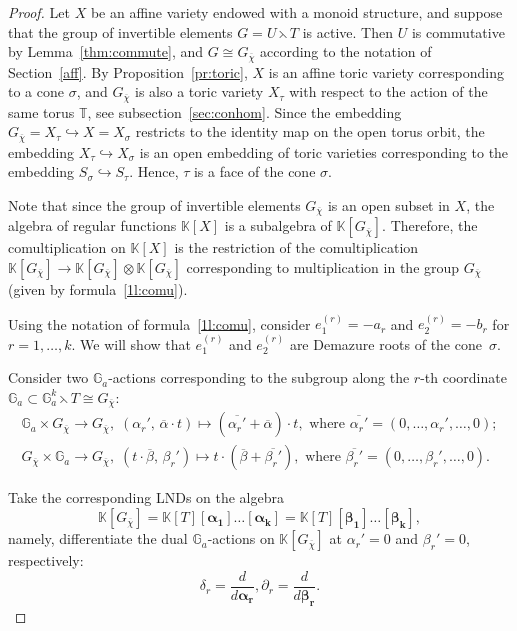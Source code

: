 \documentclass[a4paper, 11pt]{amsart}
\theoremstyle{plain}
\theoremstyle{remark}
\theoremstyle{definition}
\newcommand{\KK}{\mathbb{K}}
\newcommand{\G}{\mathbb{G}}
\newcommand{\GG}{G_{\overline{\chi}}}
\newcommand{\TT}{\mathbb{T}}
\newcommand{\ol}[1]{\overline{#1}}
\newcommand{\Alp}[1]{\pmb{\alpha_{#1}}}
\newcommand{\Bet}[1]{\pmb{\beta_{#1}}}
\begin{document}
\begin{proof}
	Let $X$ be an affine variety endowed with a monoid structure, and suppose that the group of invertible elements $G = U \leftthreetimes T$ is active. Then $U$ is commutative by Lemma~\ref{thm:commute}, and $G \cong \GG$ according to the notation of Section~\ref{aff}. By Proposition~\ref{pr:toric}, $X$ is an affine toric variety corresponding to a cone $\sigma$, and $\GG$ is also a toric variety $X_\tau$ with respect to the action of the same torus $\TT$, see subsection~\ref{sec:conhom}. Since the embedding $\GG = X_\tau \hookrightarrow X = X_\sigma$ restricts to the identity map on the open torus orbit, the embedding $X_\tau \hookrightarrow X_\sigma$ is an open embedding of toric varieties corresponding to the embedding $S_\sigma \hookrightarrow S_\tau$. Hence, $\tau$ is a face of the cone $\sigma$. 
	
	Note that since the group of invertible elements $\GG$ is an open subset in $X$, the algebra of regular functions $\KK[X]$ is a subalgebra of $\KK[\GG]$. Therefore, the comultiplication on $\KK[X]$ is the restriction of the comultiplication ${\KK[\GG] \rightarrow \KK[\GG] \otimes \KK[\GG]}$ corresponding to multiplication in the group $\GG$ (given by formula~\eqref{1l:comu}).
	
	Using the notation of formula~\eqref{1l:comu}, consider $e_1^{(r)} = -a_r$ and $e_2^{(r)} = -b_r$ for $r = 1, \ldots, k$. We will show that $e_1^{(r)}$ and $e_2^{(r)}$ are Demazure roots of the cone~$\sigma$.
	
	Consider two $\G_a$-actions corresponding to the subgroup along the $r$-th coordinate \linebreak[4] ${\G_a \subset \G_a^k \leftthreetimes T \cong \GG}$:
    \begin{equation}
   		\begin{gathered}
    		\G_a \times \GG \rightarrow \GG, \; (\alpha_r',\, \ol{\alpha}\cdot t) \mapsto (\ol{\alpha_r'} + \ol{\alpha})\cdot t, \text{ where } \ol{\alpha_r'} = (0, \ldots, \alpha_r', \ldots, 0); \\
    		\GG \times \G_a \rightarrow \GG, \;   (t \cdot\ol{\beta},\, \beta_r') \mapsto t \cdot (\ol{\beta} + \ol{\beta_r'}) , 
    		\text{ where } \ol{\beta_r'} = (0, \ldots, \beta_r', \ldots, 0).
   		\end{gathered}
   	\end{equation}

	Take the corresponding LNDs on the algebra \[\KK[\GG] = \KK[T][\Alp{1}]\ldots[\Alp{k}] = \KK[T][\Bet{1}]\ldots[\Bet{k}],\] namely, differentiate the dual $\G_a$-actions on $\KK[\GG]$ at $\alpha_r' = 0$ and $\beta_r' = 0$, respectively:
	\begin{equation*}
    	\delta_{r} = \frac{d}{d \Alp{r}},  \partial_{r} = \frac{d}{d \Bet{r}}.
    \end{equation*}


\end{proof}
\end{document}
